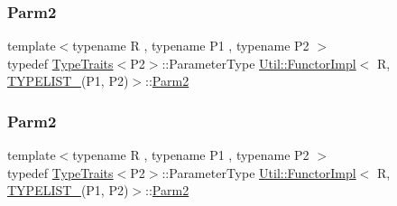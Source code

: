 \mbox{\label{classUtil_1_1FunctorImpl_3_01R_00_01TYPELIST__2_07P1_00_01P2_08_4_a9df4ce5861151ea2ca3416ee19140d5f}} 
\subsubsection{\texorpdfstring{Parm2}{Parm2}\hspace{0.1cm}{\footnotesize\ttfamily [1/2]}}
{\footnotesize\ttfamily template$<$typename R , typename P1 , typename P2 $>$ \\
typedef \mbox{\hyperlink{classUtil_1_1TypeTraits}{Type\+Traits}}$<$P2$>$\+::Parameter\+Type \mbox{\hyperlink{classUtil_1_1FunctorImpl}{Util\+::\+Functor\+Impl}}$<$ R, \mbox{\hyperlink{install_2include_2adat_2typelist_8h_a311cb99af993804c6737ae46c5cbfaff}{T\+Y\+P\+E\+L\+I\+S\+T\+\_}}(P1, P2)$>$\+::\mbox{\hyperlink{structUtil_1_1Private_1_1FunctorImplBase_a554085cd798ef14838a59b528f0feb2e}{Parm2}}}

\mbox{\label{classUtil_1_1FunctorImpl_3_01R_00_01TYPELIST__2_07P1_00_01P2_08_4_a9df4ce5861151ea2ca3416ee19140d5f}} 
\subsubsection{\texorpdfstring{Parm2}{Parm2}\hspace{0.1cm}{\footnotesize\ttfamily [2/2]}}
{\footnotesize\ttfamily template$<$typename R , typename P1 , typename P2 $>$ \\
typedef \mbox{\hyperlink{classUtil_1_1TypeTraits}{Type\+Traits}}$<$P2$>$\+::Parameter\+Type \mbox{\hyperlink{classUtil_1_1FunctorImpl}{Util\+::\+Functor\+Impl}}$<$ R, \mbox{\hyperlink{install_2include_2adat_2typelist_8h_a311cb99af993804c6737ae46c5cbfaff}{T\+Y\+P\+E\+L\+I\+S\+T\+\_}}(P1, P2)$>$\+::\mbox{\hyperlink{structUtil_1_1Private_1_1FunctorImplBase_a554085cd798ef14838a59b528f0feb2e}{Parm2}}}

